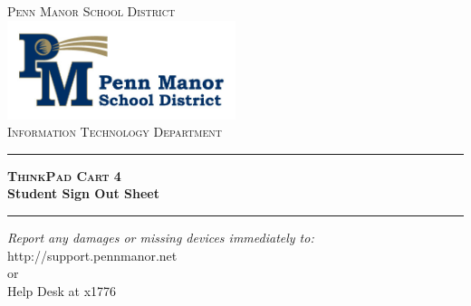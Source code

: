 \begin{titlepage}

\begin{center}

\textsc{\LARGE Penn Manor School District}\\[1.5cm]


\includegraphics[width=0.5\textwidth]{images/logo}\\[1cm]


\textsc{\Large Information Technology Department}\\[0.5cm]


\hrule
{\huge \bfseries \textsc{ThinkPad Cart} 4\\ \vspace{0.5cm} Student Sign Out Sheet}\\[0.4cm]

\hrule


\vfill
\begin{center} \large
\emph{Report any damages or missing devices immediately to:}\\
http://support.pennmanor.net \\or\\Help Desk at x1776
\end{center}


\vfill

\end{center}

\end{titlepage}
